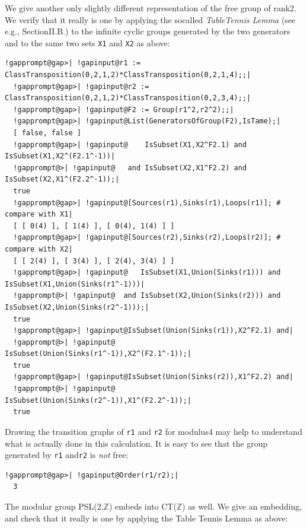 \documentclass[a4paper,11pt]{report}
\begin{document}
{{ We give another only slightly different representation of the free group of
rank{\nobreakspace}2. We verify that it really is one by applying the
so\texttt{}called \emph{Table\texttt{}Tennis Lemma} (see e.g.{\nobreakspace}\cite{LaHarpe00}, Section{\nobreakspace}II.B.) to the infinite cyclic groups generated by the
two generators and to the same two sets \texttt{X1} and \texttt{X2} as above: 
\begin{Verbatim}[commandchars=!@|,fontsize=\small,frame=single,label=Example]
  !gapprompt@gap>| !gapinput@r1 := ClassTransposition(0,2,1,2)*ClassTransposition(0,2,1,4);;|
  !gapprompt@gap>| !gapinput@r2 := ClassTransposition(0,2,1,2)*ClassTransposition(0,2,3,4);;|
  !gapprompt@gap>| !gapinput@F2 := Group(r1^2,r2^2);;|
  !gapprompt@gap>| !gapinput@List(GeneratorsOfGroup(F2),IsTame);|
  [ false, false ]
  !gapprompt@gap>| !gapinput@    IsSubset(X1,X2^F2.1) and IsSubset(X1,X2^(F2.1^-1))|
  !gapprompt@>| !gapinput@   and IsSubset(X2,X1^F2.2) and IsSubset(X2,X1^(F2.2^-1));|
  true
  !gapprompt@gap>| !gapinput@[Sources(r1),Sinks(r1),Loops(r1)]; # compare with X1|
  [ [ 0(4) ], [ 1(4) ], [ 0(4), 1(4) ] ]
  !gapprompt@gap>| !gapinput@[Sources(r2),Sinks(r2),Loops(r2)]; # compare with X2|
  [ [ 2(4) ], [ 3(4) ], [ 2(4), 3(4) ] ]
  !gapprompt@gap>| !gapinput@   IsSubset(X1,Union(Sinks(r1))) and IsSubset(X1,Union(Sinks(r1^-1)))|
  !gapprompt@>| !gapinput@  and IsSubset(X2,Union(Sinks(r2))) and IsSubset(X2,Union(Sinks(r2^-1)));|
  true
  !gapprompt@gap>| !gapinput@IsSubset(Union(Sinks(r1)),X2^F2.1) and|
  !gapprompt@>| !gapinput@   IsSubset(Union(Sinks(r1^-1)),X2^(F2.1^-1));|
  true
  !gapprompt@gap>| !gapinput@IsSubset(Union(Sinks(r2)),X1^F2.2) and|
  !gapprompt@>| !gapinput@   IsSubset(Union(Sinks(r2^-1)),X1^(F2.2^-1));|
  true
\end{Verbatim}
 Drawing the transition graphs of \texttt{r1} and \texttt{r2} for modulus{\nobreakspace}4 may help to understand what is actually done in
this calculation. It is easy to see that the group generated by \texttt{r1} and{\nobreakspace}\texttt{r2} is \emph{not} free: 
\begin{Verbatim}[commandchars=!@|,fontsize=\small,frame=single,label=Example]
  !gapprompt@gap>| !gapinput@Order(r1/r2);|
  3
\end{Verbatim}
 The modular group PSL(2,{\ensuremath{\mathbb Z}}) embeds into
CT({\ensuremath{\mathbb Z}}) as well. We give an embedding, and check that it
really is one by applying the Table Tennis Lemma as above: 
\begin{Verbatim}[commandchars=!@|,fontsize=\small,frame=single,label=Example]

\end{Verbatim}}}
\end{document}
